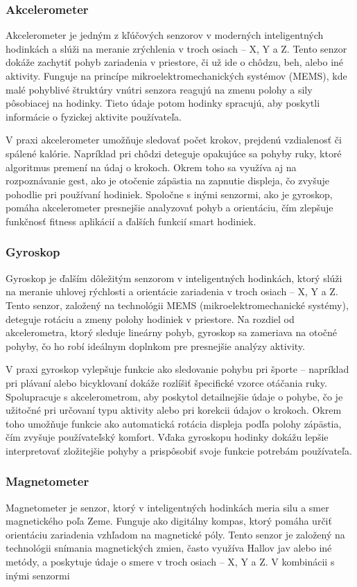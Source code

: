\subsubsection{Akcelerometer}
Akcelerometer je jedným z kľúčových senzorov v moderných inteligentných hodinkách a slúži na meranie zrýchlenia v troch osiach – X, Y a Z. Tento senzor dokáže zachytiť pohyb zariadenia v priestore, či už ide o chôdzu, beh, alebo iné aktivity. Funguje na princípe mikroelektromechanických systémov (MEMS), kde malé pohyblivé štruktúry vnútri senzora reagujú na zmenu polohy a sily pôsobiacej na hodinky. Tieto údaje potom hodinky spracujú, aby poskytli informácie o fyzickej aktivite používateľa.

V praxi akcelerometer umožňuje sledovať počet krokov, prejdenú vzdialenosť či spálené kalórie. Napríklad pri chôdzi deteguje opakujúce sa pohyby ruky, ktoré algoritmus premení na údaj o krokoch. Okrem toho sa využíva aj na rozpoznávanie gest, ako je otočenie zápästia na zapnutie displeja, čo zvyšuje pohodlie pri používaní hodiniek. Spoločne s inými senzormi, ako je gyroskop, pomáha akcelerometer presnejšie analyzovať pohyb a orientáciu, čím zlepšuje funkčnosť fitness aplikácií a ďalších funkcií smart hodiniek. \cite{sensors-article}

\subsubsection{Gyroskop}
Gyroskop je ďalším dôležitým senzorom v inteligentných hodinkách, ktorý slúži na meranie uhlovej rýchlosti a orientácie zariadenia v troch osiach – X, Y a Z. Tento senzor, založený na technológii MEMS (mikroelektromechanické systémy), deteguje rotáciu a zmeny polohy hodiniek v priestore. Na rozdiel od akcelerometra, ktorý sleduje lineárny pohyb, gyroskop sa zameriava na otočné pohyby, čo ho robí ideálnym doplnkom pre presnejšie analýzy aktivity.

V praxi gyroskop vylepšuje funkcie ako sledovanie pohybu pri športe – napríklad pri plávaní alebo bicyklovaní dokáže rozlíšiť špecifické vzorce otáčania ruky. Spolupracuje s akcelerometrom, aby poskytol detailnejšie údaje o pohybe, čo je užitočné pri určovaní typu aktivity alebo pri korekcii údajov o krokoch. Okrem toho umožňuje funkcie ako automatická rotácia displeja podľa polohy zápästia, čím zvyšuje používateľský komfort. Vďaka gyroskopu hodinky dokážu lepšie interpretovať zložitejšie pohyby a prispôsobiť svoje funkcie potrebám používateľa.\cite{sensors-article}

\subsubsection{Magnetometer}
Magnetometer je senzor, ktorý v inteligentných hodinkách meria silu a smer magnetického poľa Zeme. Funguje ako digitálny kompas, ktorý pomáha určiť orientáciu zariadenia vzhľadom na magnetické póly. Tento senzor je založený na technológii snímania magnetických zmien, často využíva Hallov jav alebo iné metódy, a poskytuje údaje o smere v troch osiach – X, Y a Z. V kombinácii s inými senzormi

